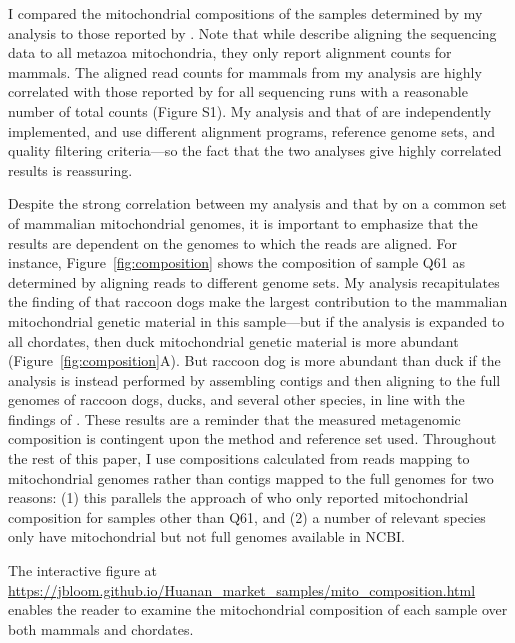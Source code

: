 \documentclass[9pt,twocolumn,twoside]{gsajnl_modified}
\begin{document}
I compared the mitochondrial compositions of the samples determined by my analysis to those reported by \citet{crits2023genetic}.
Note that while \citet{crits2023genetic} describe aligning the sequencing data to all metazoa mitochondria, they only report alignment counts for mammals.
The aligned read counts for mammals from my analysis are highly correlated with those reported by \citet{crits2023genetic} for all sequencing runs with a reasonable number of total counts (Figure S1).
My analysis and that of \citet{crits2023genetic} are independently implemented, and use different alignment programs, reference genome sets, and quality filtering criteria---so the fact that the two analyses give highly correlated results is reassuring.

Despite the strong correlation between my analysis and that by \citet{crits2023genetic} on a common set of mammalian mitochondrial genomes, it is important to emphasize that the results are dependent on the genomes to which the reads are aligned.
For instance, Figure~\ref{fig:composition} shows the composition of sample Q61 as determined by aligning reads to different genome sets.
My analysis recapitulates the finding of \citet{crits2023genetic} that raccoon dogs make the largest contribution to the mammalian mitochondrial genetic material in this sample---but if the analysis is expanded to all chordates, then duck mitochondrial genetic material is more abundant (Figure~\ref{fig:composition}A).
But raccoon dog is more abundant than duck if the analysis is instead performed by assembling contigs and then aligning to the full genomes of raccoon dogs, ducks, and several other species, in line with the findings of \citet{crits2023genetic}.
These results are a reminder that the measured metagenomic composition is contingent upon the method and reference set used.
Throughout the rest of this paper, I use compositions calculated from reads mapping to mitochondrial genomes rather than contigs mapped to the full genomes for two reasons: (1) this parallels the approach of \citet{crits2023genetic} who only reported mitochondrial composition for samples other than Q61, and (2) a number of relevant species only have mitochondrial but not full genomes available in NCBI.

The interactive figure at \url{https://jbloom.github.io/Huanan_market_samples/mito_composition.html} enables the reader to examine the mitochondrial composition of each sample over both mammals and chordates.
\end{document}
